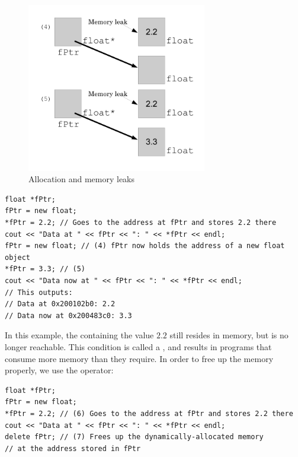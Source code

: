 \begin{figure}[tbh]
  \centering
  \includegraphics[width=0.7\textwidth]{diagrams/new_operator_diagram_2.pdf}
  \caption{Allocation and memory leaks} \label{fig:new_operator_diagram_2} 
\end{figure}

\noindent\begin{minipage}{\linewidth}\begin{lstlisting}
float *fPtr;
fPtr = new float;
*fPtr = 2.2; // Goes to the address at fPtr and stores 2.2 there
cout << "Data at " << fPtr << ": " << *fPtr << endl;
fPtr = new float; // (4) fPtr now holds the address of a new float object
*fPtr = 3.3; // (5)
cout << "Data now at " << fPtr << ": " << *fPtr << endl;
// This outputs: 
// Data at 0x200102b0: 2.2
// Data now at 0x200483c0: 3.3
\end{lstlisting}\end{minipage}

In this example, the  containing the value $2.2$ still resides in memory, but is no longer reachable. 
This condition is called a , and results in programs that consume more memory than they require. 
In order to free up the memory properly, we use the  operator:

\noindent\begin{minipage}{\linewidth}\begin{lstlisting}
float *fPtr;
fPtr = new float;
*fPtr = 2.2; // (6) Goes to the address at fPtr and stores 2.2 there
cout << "Data at " << fPtr << ": " << *fPtr << endl;
delete fPtr; // (7) Frees up the dynamically-allocated memory 
// at the address stored in fPtr
\end{lstlisting}\end{minipage}

